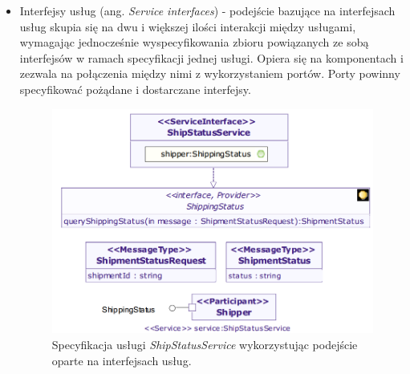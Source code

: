 \begin{itemize}
\item{Interfejsy usług (ang. \emph{Service interfaces}) - podejście bazujące na interfejsach usług skupia się na dwu i większej ilości interakcji między usługami, wymagając jednocześnie wyspecyfikowania zbioru powiązanych ze sobą interfejsów w ramach specyfikacji jednej usługi. Opiera się na komponentach i zezwala na połączenia między nimi z wykorzystaniem portów. Porty powinny specyfikować pożądane i dostarczane interfejsy. 
\begin{figure}[h!tbp]
\begin{centering}
\includegraphics[width=11cm]{img/service_interface_based_approach.png}
\caption[Specyfikacja usługi \emph{ShipStatusService} wykorzystując podejście oparte na interfejsach usług.]{Specyfikacja usługi \emph{ShipStatusService} wykorzystując podejście oparte na interfejsach usług. \cite{SoaMLErvBase}}\label{service_interface_based_approach}
\end{centering}
\end{figure}} 


\end{itemize}
